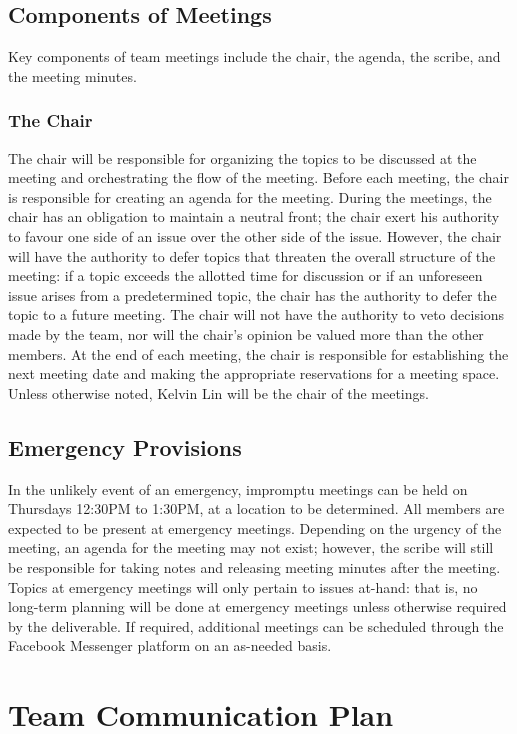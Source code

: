 \documentclass{article}
\begin{document}
\subsection{Components of Meetings}
Key components of team meetings include the chair, the agenda, the scribe, and 
the meeting minutes.

\subsubsection{The Chair}
The chair will be responsible for organizing the topics to be discussed at the 
meeting and orchestrating the flow of the meeting. Before each meeting, the 
chair is responsible for creating an agenda for the meeting. During the 
meetings, the chair has an obligation to maintain a neutral front; the chair 
exert his authority to favour one side of an issue over the other side of the 
issue. However, the chair will have the authority to defer topics that threaten 
the overall structure of the meeting: if a topic exceeds the allotted time for 
discussion or if an unforeseen issue arises from a predetermined topic, the 
chair has the authority to defer the topic to a future meeting. The chair will 
not have the authority to veto decisions made by the team, nor will the chair's 
opinion be valued more than the other members. At the end of each meeting, the 
chair is responsible for establishing the next meeting date and making the 
appropriate reservations for a meeting space. Unless otherwise noted, Kelvin Lin 
will be the chair of the meetings.


\subsection{Emergency Provisions}
In the unlikely event of an emergency, impromptu meetings can be held on 
Thursdays 12:30PM to 1:30PM, at a location to be determined. All members are 
expected to be present at emergency meetings. Depending on the urgency of the 
meeting, an agenda for the meeting may not exist; however, the scribe will still 
be responsible for taking notes and releasing meeting minutes after the meeting. 
Topics at emergency meetings will only pertain to issues at-hand: that is, no 
long-term planning will be done at emergency meetings unless otherwise required 
by the deliverable. If required, additional meetings can be scheduled through 
the Facebook Messenger platform on an as-needed basis.

\section{Team Communication Plan}
\end{document}
